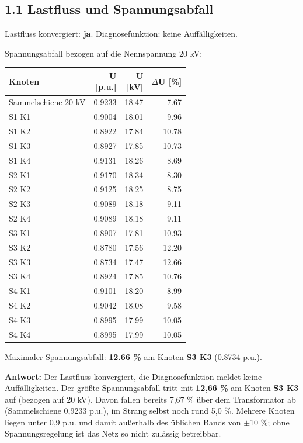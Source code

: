 \documentclass[11pt,a4paper]{article}
\begin{document}
\subsection{1.1 Lastfluss und Spannungsabfall}

Lastfluss konvergiert: \textbf{ja}. Diagnosefunktion: keine Auffälligkeiten.

Spannungsabfall bezogen auf die Nennspannung 20 kV:

\begin{table}[H]
\centering
\begin{adjustbox}{max width=\linewidth}
\begin{tabular}{lrrr}
\toprule
\textbf{Knoten} & \thead{U \\ {[p.u.]}} & \thead{U \\ {[kV]}} & \thead{$\Delta$U \\ {[\%]}} \\
\midrule
Sammelschiene 20 kV & 0.9233 & 18.47 & 7.67 \\
S1 K1 & 0.9004 & 18.01 & 9.96 \\
S1 K2 & 0.8922 & 17.84 & 10.78 \\
S1 K3 & 0.8927 & 17.85 & 10.73 \\
S1 K4 & 0.9131 & 18.26 & 8.69 \\
S2 K1 & 0.9170 & 18.34 & 8.30 \\
S2 K2 & 0.9125 & 18.25 & 8.75 \\
S2 K3 & 0.9089 & 18.18 & 9.11 \\
S2 K4 & 0.9089 & 18.18 & 9.11 \\
S3 K1 & 0.8907 & 17.81 & 10.93 \\
S3 K2 & 0.8780 & 17.56 & 12.20 \\
S3 K3 & 0.8734 & 17.47 & 12.66 \\
S3 K4 & 0.8924 & 17.85 & 10.76 \\
S4 K1 & 0.9101 & 18.20 & 8.99 \\
S4 K2 & 0.9042 & 18.08 & 9.58 \\
S4 K3 & 0.8995 & 17.99 & 10.05 \\
S4 K4 & 0.8995 & 17.99 & 10.05 \\
\bottomrule
\end{tabular}
\end{adjustbox}
\end{table}

Maximaler Spannungsabfall: \textbf{12.66 \%} am Knoten \textbf{S3 K3} (0.8734 p.u.).

\textbf{Antwort:} Der Lastfluss konvergiert, die Diagnosefunktion meldet keine Auffälligkeiten. Der größte Spannungsabfall tritt mit \textbf{12,66 \%} am Knoten \textbf{S3 K3} auf (bezogen auf 20 kV). Davon fallen bereits 7,67 \% über dem Transformator ab (Sammelschiene 0,9233 p.u.), im Strang selbst noch rund 5,0 \%. Mehrere Knoten liegen unter 0,9 p.u. und damit außerhalb des üblichen Bands von $\pm$10 \%; ohne Spannungsregelung ist das Netz so nicht zulässig betreibbar.
\end{document}
